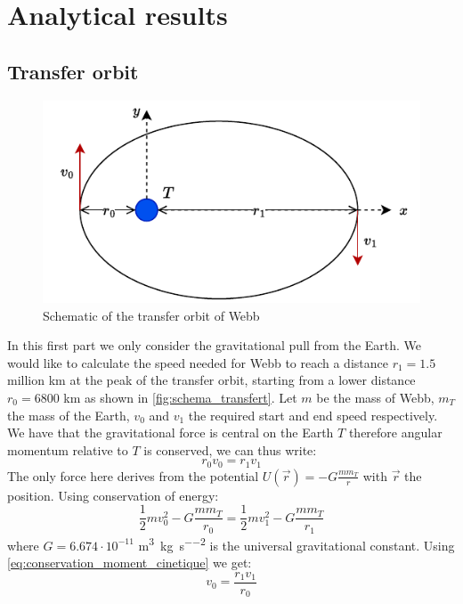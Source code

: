 \section{Analytical results}

\subsection{Transfer orbit}

\begin{figure}[h]
    \centering
    \includegraphics[width=0.6\linewidth]{figures/transfert.pdf}
    \caption{Schematic of the transfer orbit of Webb}
    \label{fig:schema_transfert}
\end{figure}
In this first part we only consider the gravitational pull from the Earth. We would like to calculate the speed needed for Webb to reach a distance \(r_1 = 1.5\) million km at the peak of the transfer orbit, starting from a lower distance \(r_0 = 6800\) km as shown in \autoref{fig:schema_transfert}. Let \(m\) be the mass of Webb, \(m_T\) the mass of the Earth, \(v_0\) and \(v_1\) the required start and end speed respectively. We have that the gravitational force is central on the Earth $T$ therefore angular momentum relative to $T$ is conserved, we can thus write:
\begin{equation}
    r_0 v_0 = r_1 v_1
    \label{eq:conservation_moment_cinetique}
\end{equation}
The only force here derives from the potential $U(\vec{r}) = -G \frac{m m_T}{r}$ with $\vec{r}$ the position. Using conservation of energy:
\begin{equation}
    \frac{1}{2} m v_0^2 - G \frac{m m_T}{r_0} = \frac{1}{2} m v_1^2 - G \frac{m m_T}{r_1}
    \label{eq:conservation_energy}
\end{equation}
where \(G = 6.674 \cdot 10^{-11}\) \si{\meter\cubed\per\kilo\gram\per\second\squared} is the universal gravitational constant. Using \autoref{eq:conservation_moment_cinetique} we get:
\begin{equation}
    v_0 = \frac{r_1 v_1}{r_0}
    \label{eq:v0_substitution}
\end{equation}
